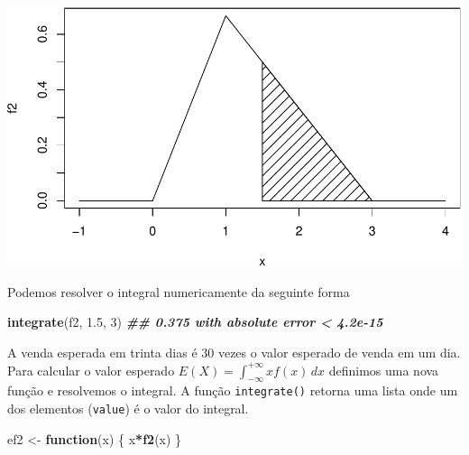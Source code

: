 \documentclass[
]{book}
\newenvironment{Shaded}{\begin{snugshade}}{\end{snugshade}}
\newcommand{\ControlFlowTok}[1]{\textcolor[rgb]{0.13,0.29,0.53}{\textbf{#1}}}
\newcommand{\DecValTok}[1]{\textcolor[rgb]{0.00,0.00,0.81}{#1}}
\newcommand{\DocumentationTok}[1]{\textcolor[rgb]{0.56,0.35,0.01}{\textbf{\textit{#1}}}}
\newcommand{\FloatTok}[1]{\textcolor[rgb]{0.00,0.00,0.81}{#1}}
\newcommand{\FunctionTok}[1]{\textcolor[rgb]{0.13,0.29,0.53}{\textbf{#1}}}
\newcommand{\NormalTok}[1]{#1}
\newcommand{\OtherTok}[1]{\textcolor[rgb]{0.56,0.35,0.01}{#1}}
\newcommand{\SpecialCharTok}[1]{\textcolor[rgb]{0.81,0.36,0.00}{\textbf{#1}}}
\begin{document}
\includegraphics{introR_files/figure-latex/unnamed-chunk-237-1.pdf}

Podemos resolver o integral numericamente da seguinte forma

\begin{Shaded}
\begin{Highlighting}[]
\FunctionTok{integrate}\NormalTok{(f2, }\FloatTok{1.5}\NormalTok{, }\DecValTok{3}\NormalTok{)}
\DocumentationTok{\#\# 0.375 with absolute error \textless{} 4.2e{-}15}
\end{Highlighting}
\end{Shaded}

A venda esperada em trinta dias é 30 vezes o valor esperado de venda em um dia. Para calcular o valor esperado \(E(X) = \int_{-\infty}^{+\infty}xf(x)\,dx\) definimos uma nova função e resolvemos o integral. A função \texttt{integrate()} retorna uma lista onde um dos elementos (\texttt{value}) é o valor do integral.

\begin{Shaded}
\begin{Highlighting}[]
\NormalTok{ef2 }\OtherTok{\textless{}{-}} \ControlFlowTok{function}\NormalTok{(x) \{}
\NormalTok{  x}\SpecialCharTok{*}\FunctionTok{f2}\NormalTok{(x)}
\NormalTok{\}}
\end{Highlighting}
\end{Shaded}

\begin{Shaded}
\end{Shaded}
\end{document}
